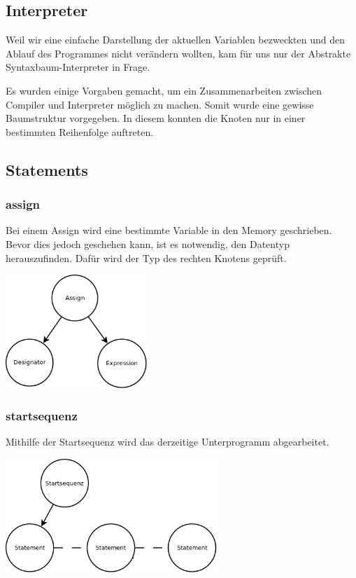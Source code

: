 \subsection{Interpreter}
Weil wir eine einfache Darstellung der aktuellen Variablen bezweckten und den Ablauf des Programmes nicht verändern wollten, kam für 
uns nur der Abstrakte Syntaxbaum-Interpreter in Frage.

Es wurden einige Vorgaben gemacht, um ein Zusammenarbeiten zwischen Compiler und Interpreter möglich zu machen. Somit wurde eine gewisse
Baumstruktur vorgegeben. In diesem konnten die Knoten nur in einer bestimmten Reihenfolge auftreten.

\subsection{Statements}
\subsubsection{assign}
Bei einem Assign wird eine bestimmte Variable in den Memory geschrieben. Bevor dies jedoch geschehen kann, ist es notwendig,
den Datentyp herauszufinden. Dafür wird der Typ des rechten Knotens geprüft.

\includegraphics[width=0.4\textwidth]{./media/images/interpreter/syntaxbaum/statements/assign.png}

\subsubsection{startsequenz}
Mithilfe der Startsequenz wird das derzeitige Unterprogramm abgearbeitet.

\includegraphics[width=0.6\textwidth]{./media/images/interpreter/syntaxbaum/statements/startsequenz.png}

